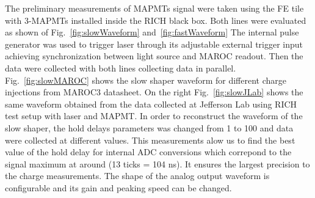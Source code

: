 The preliminary measurements of MAPMTs signal were taken using the FE tile with 3-MAPMTs installed inside the RICH black box.
Both lines were evaluated as shown of Fig.~\ref{fig:slowWaveform} and~\ref{fig:fastWaveform}
The internal pulse generator was used to trigger laser through its adjustable external trigger input achieving synchronization between light source and MAROC readout.
Then the data were collected with both lines collecting data in parallel.
Fig.~\ref{fig:slowMAROC} shows the slow shaper waveform for different charge injections from MAROC3 datasheet.
On the right Fig.~\ref{fig:slowJLab} shows the same waveform obtained from the data collected at Jefferson Lab using RICH test setup with laser and MAPMT.
In order to reconstruct the waveform of the slow shaper, the hold delays parameters was changed from 1 to 100 and data were collected at different values.
This measurements alow us to find the best value of the hold delay for internal ADC conversions which correpond to the signal maximum at around (13 ticks = 104 ns).
It ensures the largest precision to the charge measurements.
The shape of the analog output waveform is configurable and its gain and peaking speed can be changed.


